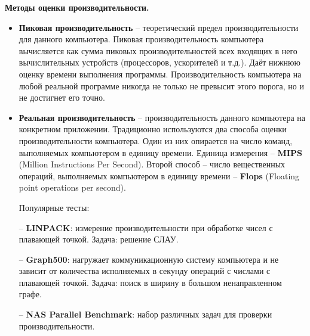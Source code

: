 \textbf{Методы оценки производительности.}
\begin{itemize}
    \item \textbf{Пиковая производительность} -- теоретический предел производительности для данного компьютера. Пиковая производительность компьютера вычисляется как сумма пиковых производительностей всех входящих в него вычислительных устройств (процессоров, ускорителей и т.д.). Даёт нижнюю оценку времени выполнения программы. Производительность компьютера на любой реальной программе никогда не только не превысит этого порога, но и не достигнет его точно.
    \item \textbf{Реальная производительность} -- производительность данного компьютера на конкретном приложении. Традиционно используются два способа оценки производительности компьютера. Один из них опирается на число команд, выполняемых компьютером в единицу времени. Единица измерения -- \textbf{MIPS} (Million Instructions Per Second). Второй способ -- число вещественных операций, выполняемых компьютером в единицу времени -- \textbf{Flops} (Floating point operations per second).
    
    Популярные тесты: 
    \item[--] \textbf{LINPACK}: измерение производительности при обработке чисел с плавающей точкой. Задача: решение СЛАУ.
    \item[--] \textbf{Graph500}: нагружает коммуникационную систему компьютера и не зависит от количества исполняемых в секунду операций с числами с плавающей точкой. Задача: поиск в ширину в большом ненаправленном графе.
    \item[--] \textbf{NAS Parallel Benchmark}: набор различных задач для проверки производительности.
\end{itemize}



